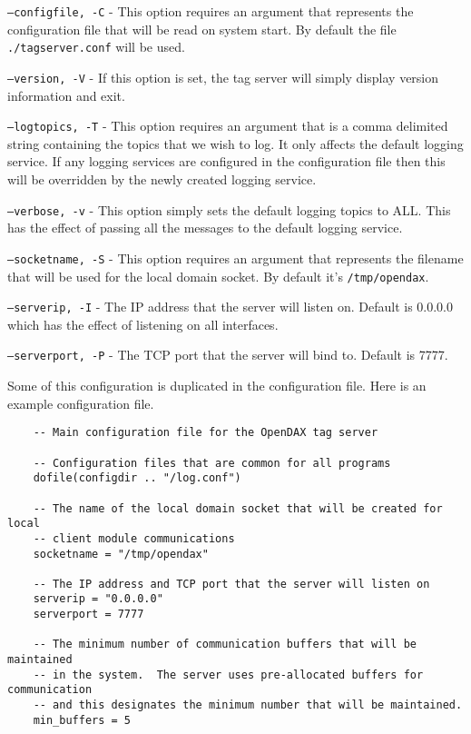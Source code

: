 	\begin{list}{}{Command Line Options}
		\item[\texttt{--configfile, -C}] - This option requires an argument that
		represents the configuration file that will be read on system start.  By default
		the file \texttt{./tagserver.conf} will be used.
		\item[\texttt{--version, -V}] - If this option is set, the tag server will
		simply display version information and exit.
		\item[\texttt{--logtopics, -T}] - This option requires an argument that is a
		comma delimited string containing the topics that we wish to log.  It only
		affects the default logging service.  If any logging services are configured in
		the configuration file then this will be overridden by the newly created logging
		service.
		\item[\texttt{--verbose, -v}] - This option simply sets the default logging
		topics to ALL.  This has the effect of passing all the messages to the default
		logging service.
		\item[\texttt{--socketname, -S}] - This option requires an argument that
		represents the filename that will be used for the local domain socket.  By
		default it's \texttt{/tmp/opendax}.
		\item[\texttt{--serverip, -I}] - The IP address that the server will listen on.
		Default is 0.0.0.0 which has the effect of listening on all interfaces.
		\item[\texttt{--serverport, -P}] - The TCP port that the server will bind to.
		Default is 7777.
	\end{list}

	Some of this configuration is duplicated in the configuration file.  Here is an
	example configuration file.


	\begin{verbatim}
	-- Main configuration file for the OpenDAX tag server

	-- Configuration files that are common for all programs
	dofile(configdir .. "/log.conf")

	-- The name of the local domain socket that will be created for local
	-- client module communications
	socketname = "/tmp/opendax"

	-- The IP address and TCP port that the server will listen on
	serverip = "0.0.0.0"
	serverport = 7777

	-- The minimum number of communication buffers that will be maintained
	-- in the system.  The server uses pre-allocated buffers for communication
	-- and this designates the minimum number that will be maintained.
	min_buffers = 5

	\end{verbatim}

